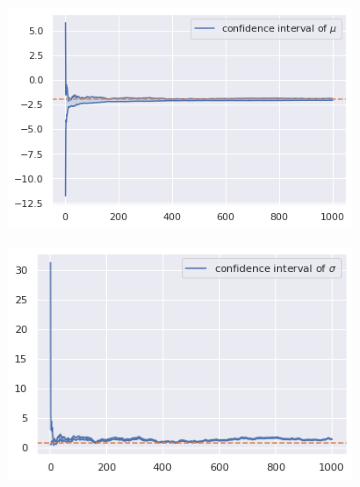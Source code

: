 	\begin{figure}[tbp]
        \centering
        \begin{subfigure}[b]{0.47\textwidth}
            \centering
            \includegraphics[width=\textwidth]{resources/task5_CI_mu.png}
            \caption{}
            \label{CI_mu}
        \end{subfigure}
        \hfill
        \begin{subfigure}[b]{0.45\textwidth}
            \centering
            \includegraphics[width=\textwidth]{resources/task5_CI_sigma.png}
            \caption{}
            \label{CI_sigma}
        \end{subfigure}
        \caption{} \label{CI}
    \end{figure}

